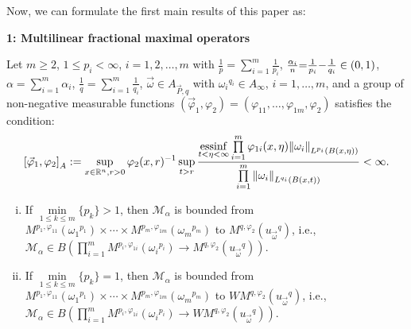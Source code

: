 \documentclass[11pt, twoside, leqno]{article}
\begin{document}
Now, we can formulate the first main results of this paper as:
\begin{center}
	\textbf{1: Multilinear fractional maximal operators}
\end{center}

\begin{thm}\label{FRM}
	Let $m\geq 2$, $1\leq p_i<\infty$, $i=1,2,\ldots,m$ with $\frac{1}{p} = \sum\limits_{i = 1}^m {\frac{1}{{{p_i}}}}$, $\frac{{{\alpha _i}}}{n}{\rm{ = }}\frac{1}{{{p_i}}}{\rm{ - }}\frac{1}{{{q_i}}} \in (0,1)$, $\alpha  = \sum\limits_{i = 1}^m {{\alpha _i}}$, $\frac{1}{q} = \sum\limits_{i = 1}^m {\frac{1}{{{q_i}}}}$, $\vec{\omega} \in {A_{\vec P,q}}$ with ${\omega _i}^{{q_i}} \in {A_\infty }$, $i = 1, \ldots ,m$, and a group of non-negative measurable functions $({{\vec \varphi }_1},{\varphi _2}) = ({\varphi _{11}}, \ldots ,{\varphi _{1m}},{\varphi _2})$ satisfies the condition:
	\begin{equation}\label{con5}
	{\left[ {{{\vec \varphi }_1},{\varphi _2}} \right]_A}: = \mathop {\sup }\limits_{x \in {{\mathbb R^n}},r > 0} {\varphi _2}{(x,r)^{{\rm{ - }}1}}\mathop {\sup }\limits_{t > r} \frac{{\mathop {{\rm{essinf}}}\limits_{t < \eta  < \infty } \prod\limits_{i = 1}^m {{\varphi _{1i}}(x,\eta ){{\left\| {{\omega _i}} \right\|}_{{L^{{p_i}}}(B(x,\eta ))}}} }}{{\prod\limits_{i = 1}^m {{{\left\| {{\omega _i}} \right\|}_{{L^{{q_i}}}(B(x,t))}}} }} < \infty.
	\end{equation}
	
	\begin{enumerate}[(i)]
		\item If $\mathop {\min }\limits_{1 \le k \le m} \{ {p_k}\}  > 1$, then $\mathcal{M}_\alpha$ is bounded from ${M^{{p_1},{\varphi _{11}}}}({\omega _1}^{p_1}) \times  \cdots  \times {M^{{p_m},{\varphi _{1m}}}}({\omega _m}^{p_m})$ to ${M^{q,{\varphi _2}}}({u_{\vec \omega }}^q)$, i.e., $\mathcal{M}_\alpha \in B\left( {\prod\limits_{i = 1}^m {{M^{{p_i},{\varphi _{1i}}}}\left( {{\omega _i}^{p_i}} \right)}  \to {M^{q,{\varphi _2}}}\left( {{u_{\vec \omega }}^q} \right)} \right)$.
		\item If $\mathop {\min }\limits_{1 \le k \le m} \{ {p_k}\}  = 1$, then $\mathcal{M}_\alpha$ is bounded from ${M^{{p_1},{\varphi _{11}}}}({\omega _1}^{p_1}) \times  \cdots  \times {M^{{p_m},{\varphi _{1m}}}}({\omega _m}^{p_m})$ to ${WM^{q,{\varphi _2}}}({u_{\vec \omega }}^q)$, i.e., $\mathcal{M}_\alpha \in B\left( {\prod\limits_{i = 1}^m {{M^{{p_i},{\varphi _{1i}}}}\left( {{\omega _i}^{p_i}} \right)}  \to {WM^{q,{\varphi _2}}}\left( {{u_{\vec \omega }}^q} \right)} \right)$.
	\end{enumerate}
\end{thm}
\end{document}
